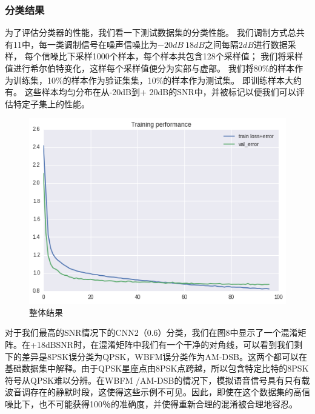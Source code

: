 \subsubsection*{分类结果}
为了评估分类器的性能，我们看一下测试数据集的分类性能。
我们调制方式总共有11中，每一类调制信号在噪声信噪比为$-20dB~18dB$之间每隔$2dB$进行数据采样，
每个信噪比下采样1000个样本，每个样本共包含128个采样值；
我们将采样值进行希尔伯特变化，这样每个采样值便分为实部与虚部。
我们将80\%的样本作为训练集，10\%的样本作为验证集集，10\%的样本作为测试集。
即训练样本大约有。 这些样本均匀分布在从-20dB到+ 20dB的SNR中，并被标记以便我们可以评估特定子集上的性能。\par
\begin{figure}[!h]
	\centering
	\includegraphics[scale=0.3]{figures/chapter_3/loss}
	\caption{整体结果}	\label{sec:fig_3_9}
\end{figure}
对于我们最高的SNR情况下的CNN2（0.6）分类，我们在图8中显示了一个混淆矩阵。在+18dBSNR时，在混淆矩阵中我们有一个干净的对角线，可以看到我们剩下的差异是8PSK误分类为QPSK，WBFM误分类作为AM-DSB。这两个都可以在基础数据集中解释。由于QPSK星座点由8PSK点跨越，所以包含特定比特的8PSK符号从QPSK难以分辨。在WBFM /AM-DSB的情况下，模拟语音信号具有只有载波音调存在的静默时段，这使得这些示例不可见。因此，即使在这个数据集的高信噪比下，也不可能获得100％的准确度，并使得重新合理的混淆被合理地容忍。\par
